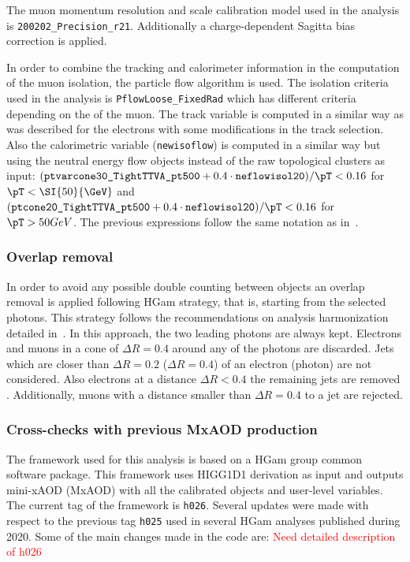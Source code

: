 The muon momentum resolution and scale calibration model used in the analysis is \texttt{200202\_Precision\_r21}. Additionally a charge-dependent Sagitta bias correction is applied.

In order to combine the tracking and calorimeter information in the computation of the muon isolation, the particle flow algorithm is used. The isolation criteria used in the analysis is \texttt{PflowLoose\_FixedRad} which has different criteria depending on the \pT of the muon. The track variable is computed in a similar way as was described for the electrons with some modifications in the track selection. Also the calorimetric variable (\texttt{newisoflow}) is computed in a similar way but using the neutral energy flow objects instead of the raw topological clusters as input: $(\texttt{ptvarcone30\_TightTTVA\_pt500}+0.4\cdot \texttt{neflowisol20}) /\pT < 0.16 $ for $\pT < \SI{50}{\GeV}$ and $(\texttt{ptcone20\_TightTTVA\_pt500} + 0.4 \cdot \texttt{neflowisol20})/\pT < 0.16$ for $\pT > 50 GeV$. The previous expressions follow the same notation as in~\cite{Klein:2665708}.



\subsubsection{Overlap removal}
In order to avoid any possible double counting between objects an overlap removal is applied following HGam strategy, that is, starting from the selected photons. This strategy follows the recommendations on analysis harmonization detailed in~\cite{Adams:1700874}. In this approach, the two leading photons are always kept. Electrons and muons in a cone of $\Delta R=0.4$ around any of the photons are discarded. Jets which are closer than $\Delta R=0.2$ ($\Delta R=0.4$) of an electron (photon) are not considered. Also electrons at a distance $\Delta R<0.4$ the remaining jets are removed . Additionally, muons with a distance smaller than $\Delta R=0.4$ to a jet are rejected. 




\subsubsection{Cross-checks with previous MxAOD production}
The framework used for this analysis is based on a HGam group common software package. This framework uses HIGG1D1 derivation as input and outputs mini-xAOD (MxAOD) with all the calibrated objects and user-level variables. The current tag of the framework is \texttt{h026}. Several updates were made with respect to the previous tag \texttt{h025} used in several HGam analyses published during 2020. Some of the main changes made in the code are:
\textcolor{red}{Need detailed description of h026}

